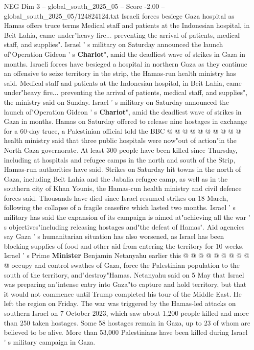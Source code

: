 \begin{textsample}{NEG Dim 3 – global\_south\_2025\_05 – Score -2.00 – global\_south\_2025\_05/124824124.txt}  \label{ex:f3_neg_175}
Israeli forces besiege Gaza hospital as Hamas offers truce terms Medical staff and patients at the Indonesian hospital, in Beit Lahia, came under"heavy fire... preventing the arrival of patients, medical staff, and supplies".
Israel ' s military on Saturday announced the launch of"Operation Gideon ' s \textbf{Chariot}", amid the deadliest wave of strikes in Gaza in months.
Israeli forces have besieged a hospital in northern Gaza as they continue an offensive to seize territory in the strip, the Hamas-run health ministry has said.
Medical staff and patients at the Indonesian hospital, in Beit Lahia, came under"heavy fire... preventing the arrival of patients, medical staff, and supplies", the ministry said on Sunday.
Israel ' s military on Saturday announced the launch of"Operation Gideon ' s \textbf{Chariot}", amid the deadliest wave of strikes in Gaza in months.
Hamas on Saturday offered to release nine hostages in exchange for a 60-day truce, a Palestinian official told the BBC @ @ @ @ @ @ @ @ @ @ health ministry said that three public hospitals were now"out of action"in the North Gaza governorate.
At least 300 people have been killed since Thursday, including at hospitals and refugee camps in the north and south of the Strip, Hamas-run authorities have said.
Strikes on Saturday hit towns in the north of Gaza, including Beit Lahia and the Jabalia refugee camp, as well as in the southern city of Khan Younis, the Hamas-run health ministry and civil defence forces said.
Thousands have died since Israel resumed strikes on 18 March, following the collapse of a fragile ceasefire which lasted two months.
Israel ' s military has said the expansion of its campaign is aimed at"achieving all the war ' s objectives"including releasing hostages and"the defeat of Hamas".
Aid agencies say Gaza ' s humanitarian situation has also worsened, as Israel has been blocking supplies of food and other aid from entering the territory for 10 weeks.
Israel ' s Prime \textbf{Minister} Benjamin Netanyahu earlier this @ @ @ @ @ @ @ @ @ @ occupy and control swathes of Gaza, force the Palestinian population to the south of the territory, and"destroy"Hamas.
Netanyahu said on 5 May that Israel was preparing an"intense entry into Gaza"to capture and hold territory, but that it would not commence until Trump completed his tour of the Middle East.
He left the region on Friday.
The war was triggered by the Hamas-led attacks on southern Israel on 7 October 2023, which saw about 1,200 people killed and more than 250 taken hostages.
Some 58 hostages remain in Gaza, up to 23 of whom are believed to be alive.
More than 53,000 Palestinians have been killed during Israel ' s military campaign in Gaza.

\end{textsample}
